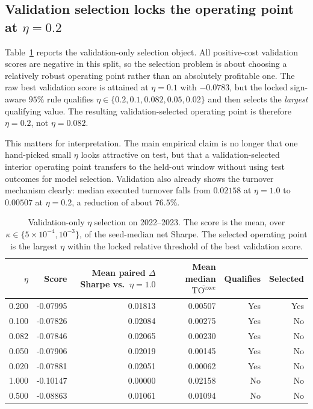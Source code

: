 \documentclass[10pt,twocolumn]{article}
\newcommand{\TOexec}{\mathrm{TO}^{\mathrm{exec}}}
\begin{document}
\subsection{Validation selection locks the operating point at $\eta=0.2$}
Table~\ref{tab:validation_selection} reports the validation-only selection object. All positive-cost validation scores are negative in this split, so the selection problem is about choosing a relatively robust operating point rather than an absolutely profitable one. The raw best validation score is attained at $\eta=0.1$ with $-0.0783$, but the locked sign-aware $95\%$ rule qualifies $\eta\in\{0.2, 0.1, 0.082, 0.05, 0.02\}$ and then selects the \emph{largest} qualifying value. The resulting validation-selected operating point is therefore $\eta=0.2$, not $\eta=0.082$.

This matters for interpretation. The main empirical claim is no longer that one hand-picked small $\eta$ looks attractive on test, but that a validation-selected interior operating point transfers to the held-out window without using test outcomes for model selection. Validation also already shows the turnover mechanism clearly: median executed turnover falls from $0.02158$ at $\eta=1.0$ to $0.00507$ at $\eta=0.2$, a reduction of about $76.5\%$.

\begin{table}[t]
\centering
\scriptsize
\caption{Validation-only $\eta$ selection on 2022--2023. The score is the mean, over $\kappa\in\{5\times10^{-4},10^{-3}\}$, of the seed-median net Sharpe. The selected operating point is the largest $\eta$ within the locked relative threshold of the best validation score.}
\label{tab:validation_selection}
\begin{tabular}{@{}rrrrrr@{}}
\toprule
$\eta$ & Score & Mean paired $\Delta$Sharpe vs.\ $\eta=1.0$ & Mean median $\overline{\TOexec}$ & Qualifies & Selected \\
\midrule
0.200 & -0.07995 & 0.01813 & 0.00507 & Yes & Yes \\
0.100 & -0.07826 & 0.02084 & 0.00275 & Yes & No \\
0.082 & -0.07846 & 0.02065 & 0.00230 & Yes & No \\
0.050 & -0.07906 & 0.02019 & 0.00145 & Yes & No \\
0.020 & -0.07881 & 0.02051 & 0.00062 & Yes & No \\
1.000 & -0.10147 & 0.00000 & 0.02158 & No & No \\
0.500 & -0.08863 & 0.01061 & 0.01094 & No & No \\
\bottomrule
\end{tabular}
\end{table}
\end{document}
